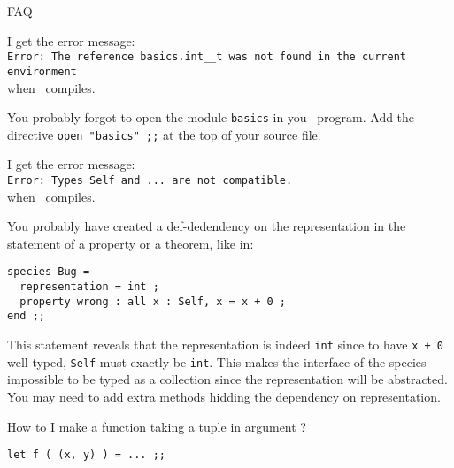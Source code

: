 \documentclass[10pt,a4paper]{article}
\begin{document}
\begin{center}
{\Huge \textbf{\focal} FAQ}
\end{center}


\begin{faqitem}
I get the error message:\\
  \verb+Error: The reference basics.int__t was not found in the current+\\
  \verb+environment+\\
when \coq\ compiles.

\medskip
{}
You probably forgot to open the module {\tt basics} in you \focal\ program.
Add the directive \lstinline{open "basics" ;;} at the top of your source
file.
\end{faqitem}


\bigskip
\begin{faqitem}
I get the error message:\\
  \verb+Error: Types Self and ... are not compatible.+\\
when \focalizec\ compiles.

\medskip
{}
You probably have created a def-dedendency on the
representation in the statement of a property or a theorem, like in:
{\small
\begin{lstlisting}
species Bug =
  representation = int ;
  property wrong : all x : Self, x = x + 0 ;
end ;;
\end{lstlisting}}


This statement reveals that the representation is indeed {\tt int} since to
have \lstinline"x + 0" well-typed, {\tt Self} must exactly be {\tt int}. This
makes the interface of the species impossible to be typed as a collection
since the representation will be abstracted. You may need to add extra methods
hidding the dependency on representation.
\end{faqitem}



\bigskip
\begin{faqitem}
How to I make a function taking a tuple in argument ?

\medskip
{}
\lstinline"let f ( (x, y) ) = ... ;;"
\end{faqitem}
\end{document}
